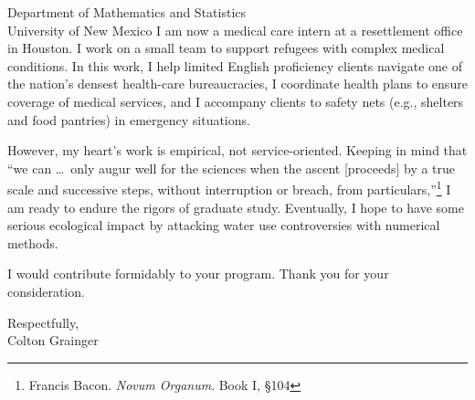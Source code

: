 \documentclass[10pt]{letter}
\begin{document}
\begin{letter}{
Department of Mathematics and Statistics\\
University of New Mexico
}
I am now a medical care intern at a resettlement office in Houston. I work on a small team to support refugees with complex medical conditions. In this work, I help limited English proficiency clients navigate one of the nation's densest health-care bureaucracies, I coordinate health plans to ensure coverage of medical services, and I accompany clients to safety nets (e.g., shelters and food pantries) in emergency situations. 

However, my heart's work is empirical, not service-oriented. Keeping in mind that ``we can \ldots\ only augur well for the sciences when the ascent [proceeds] by a true scale and successive steps, without interruption or breach, from particulars,''\footnote{Francis Bacon. \emph{Novum Organum}. Book I, \S 104} I am ready to endure the rigors of graduate study. Eventually, I hope to have some serious ecological impact by attacking water use controversies with numerical methods. 

I would contribute formidably to your program. Thank you for your consideration.

\closing{Respectfully,\\Colton Grainger}
\end{letter}
\end{document}
